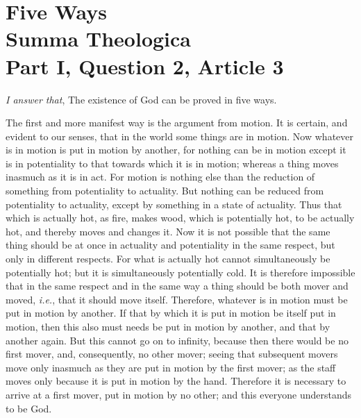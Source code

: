 
\author{Thomas Aquinas}
\chapter[Thomas Aquinas -- Five Ways]{Five Ways\\\smaller Summa
Theologica\\\smaller Part I, Question 2, Article 3}


\textit{I answer that}, The existence of God can be proved in
five ways.

The first and more manifest way is the argument from motion. It is
certain, and evident to our senses, that in the world some things are
in motion. Now whatever is in motion is put in motion by another, for
nothing can be in motion except it is in potentiality to that towards
which it is in motion; whereas a thing moves inasmuch as it is in act.
For motion is nothing else than the reduction of something from
potentiality to actuality. But nothing can be reduced from
potentiality to actuality, except by something in a state of
actuality. Thus that which is actually hot, as fire, makes wood, which
is potentially hot, to be actually hot, and thereby moves and changes
it. Now it is not possible that the same thing should be at once in
actuality and potentiality in the same  respect, but only in
different respects. For what is actually hot cannot simultaneously be
potentially hot; but it is simultaneously potentially cold. It is
therefore impossible that in the same respect and in the same way a
thing should be both mover and moved, \textit{i.e.}, that it should
move itself. Therefore, whatever is in motion must be put in motion by
another. If that by which it is put in motion be itself put in motion,
then this also must needs be put in motion by another, and that by
another again. But this cannot go on to infinity, because then there
would be no first mover, and, consequently, no other mover; seeing
that subsequent movers move only inasmuch as they are put in motion by
the first mover; as the staff moves only because it is put in motion
by the hand. Therefore it is necessary to arrive at a first mover, put
in motion by no other; and this everyone understands to be God.

